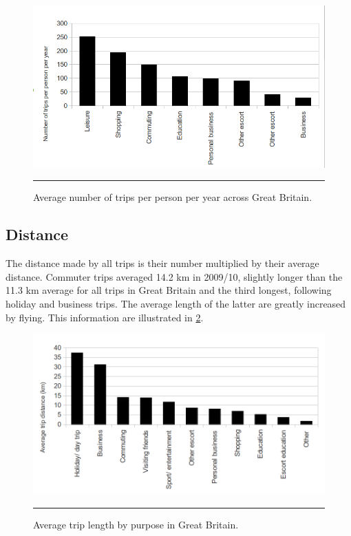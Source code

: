 \begin{figure}[htbp]
  \centerline{
    \includegraphics[width = 14 cm]{./Figures/trip-nums-gb}}
    \rule{35em}{0.5pt}
  \caption{Average number of trips per person per year across Great Britain.}
  \label{fig:trip-nums-gb}
\end{figure}

\subsection{Distance}
The distance made by all trips is their number multiplied by their average distance.
Commuter trips averaged 14.2 km in 2009/10, slightly longer than the 11.3 km
average for all trips in Great Britain and the third longest,
following holiday and business trips. The average length of the latter
are greatly increased by flying.
This information
are illustrated in \cref{fig:dist-trip-gb}.

\begin{figure}[htbp]
  \centerline{
    \includegraphics[width = 14 cm]{./Figures/dist-trip-gb}}
    \rule{35em}{0.5pt}
  \caption{Average trip length by purpose in Great Britain.}
  \label{fig:dist-trip-gb}
\end{figure}

